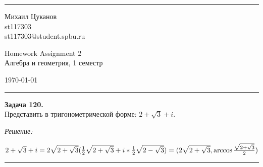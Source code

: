\documentclass[a4paper, 12pt]{article}
\newenvironment{problem}[2][Задача]
    { \begin{mdframed}[backgroundcolor=gray!10] \textbf{#1 #2.} \\}
    {  \end{mdframed}}
\newenvironment{solution}
    {\textit{Решение: }}
    {\noindent\rule{7in}{1.5pt}}
\begin{document}

\fancyhead[C]{}
\hrule \medskip %
\begin{minipage}{0.295\textwidth} 
\raggedright\footnotesize
Михаил Цуканов \hfill\\   
st117303 \hfill\\
st117303@student.spbu.ru
\end{minipage}
\begin{minipage}{0.4\textwidth} 
\centering\large 
Homework Assignment 2\\ 
\normalsize 
Алгебра и геометрия, 1 семестр\\ 
\end{minipage}
\begin{minipage}{0.295\textwidth} 
\raggedleft
\today\hfill\\
\end{minipage}
\medskip\hrule 
\bigskip


\begin{problem}{120}
Представить в тригонометрической форме: $2+\sqrt{3}+i$.
\end{problem}
\begin{solution}

$
2 + \sqrt3 + i = \\
2\sqrt{2 + \sqrt3}(\frac{1}{2}\sqrt{2 + \sqrt3} + i * \frac{1}{2}\sqrt{2 - \sqrt3}) = \\
(2\sqrt{2 + \sqrt3}, \arccos{\frac{\sqrt{2 + \sqrt3}}{2}})
$


\end{solution} 
\end{document}
